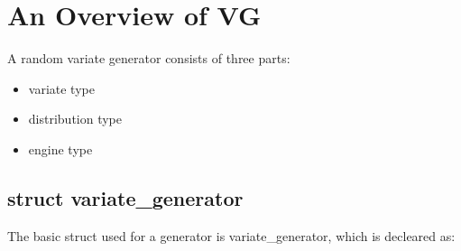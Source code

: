 \section{An Overview of VG}

A random variate generator consists of three parts:
\begin{itemize}
    \item   variate type
    \item   distribution type
    \item   engine type
\end{itemize}


\subsection{struct variate\_generator}


The basic struct used for a generator is variate\_generator, which is decleared as:

